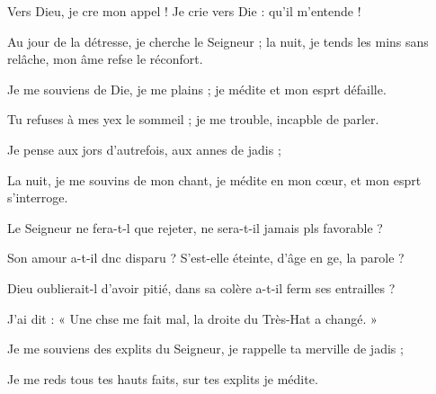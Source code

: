 \item Vers Dieu, je cre mon appel !\psstar{} Je crie vers Die : qu’il m’entende !
\item Au jour de la détresse, je cherche le Seigneur ;\pscross{} la nuit, je tends les mins sans relâche,\psstar{} mon âme refse le réconfort.
\item Je me souviens de Die, je me plains ;\psstar{} je médite et mon esprt défaille.
\item Tu refuses à mes yex le sommeil ;\psstar{} je me trouble, incapble de parler.
\item Je pense aux jors d’autrefois,\psstar{} aux annes de jadis ;
\item La nuit, je me souvins de mon chant,\psstar{} je médite en mon cœur, et mon esprt s’interroge.
\item Le Seigneur ne fera-t-l que rejeter,\psstar{} ne sera-t-il jamais pls favorable ?
\item Son amour a-t-il dnc disparu ?\psstar{} S’est-elle éteinte, d’âge en ge, la parole ?
\item Dieu oublierait-l d’avoir pitié,\psstar{} dans sa colère a-t-il ferm ses entrailles ?
\item J’ai dit : « Une chse me fait mal,\psstar{} la droite du Très-Hat a changé. »
\item Je me souviens des explits du Seigneur,\psstar{} je rappelle ta merville de jadis ;
\item Je me reds tous tes hauts faits,\psstar{} sur tes explits je médite.